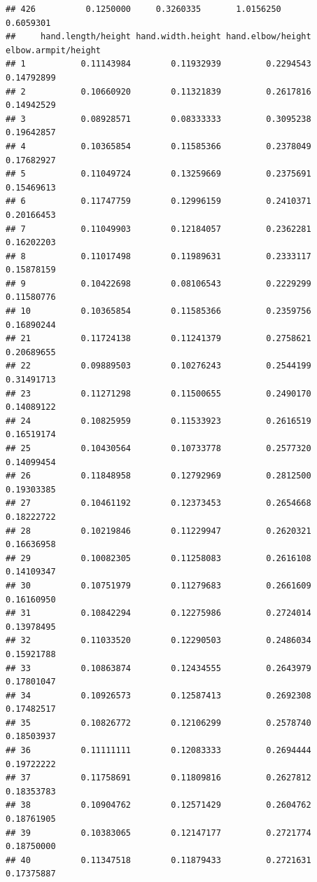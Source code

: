 \documentclass[]{article}
\begin{document}
\begin{verbatim}
## 426          0.1250000     0.3260335       1.0156250          0.6059301
##     hand.length/height hand.width.height hand.elbow/height elbow.armpit/height
## 1           0.11143984        0.11932939         0.2294543          0.14792899
## 2           0.10660920        0.11321839         0.2617816          0.14942529
## 3           0.08928571        0.08333333         0.3095238          0.19642857
## 4           0.10365854        0.11585366         0.2378049          0.17682927
## 5           0.11049724        0.13259669         0.2375691          0.15469613
## 6           0.11747759        0.12996159         0.2410371          0.20166453
## 7           0.11049903        0.12184057         0.2362281          0.16202203
## 8           0.11017498        0.11989631         0.2333117          0.15878159
## 9           0.10422698        0.08106543         0.2229299          0.11580776
## 10          0.10365854        0.11585366         0.2359756          0.16890244
## 21          0.11724138        0.11241379         0.2758621          0.20689655
## 22          0.09889503        0.10276243         0.2544199          0.31491713
## 23          0.11271298        0.11500655         0.2490170          0.14089122
## 24          0.10825959        0.11533923         0.2616519          0.16519174
## 25          0.10430564        0.10733778         0.2577320          0.14099454
## 26          0.11848958        0.12792969         0.2812500          0.19303385
## 27          0.10461192        0.12373453         0.2654668          0.18222722
## 28          0.10219846        0.11229947         0.2620321          0.16636958
## 29          0.10082305        0.11258083         0.2616108          0.14109347
## 30          0.10751979        0.11279683         0.2661609          0.16160950
## 31          0.10842294        0.12275986         0.2724014          0.13978495
## 32          0.11033520        0.12290503         0.2486034          0.15921788
## 33          0.10863874        0.12434555         0.2643979          0.17801047
## 34          0.10926573        0.12587413         0.2692308          0.17482517
## 35          0.10826772        0.12106299         0.2578740          0.18503937
## 36          0.11111111        0.12083333         0.2694444          0.19722222
## 37          0.11758691        0.11809816         0.2627812          0.18353783
## 38          0.10904762        0.12571429         0.2604762          0.18761905
## 39          0.10383065        0.12147177         0.2721774          0.18750000
## 40          0.11347518        0.11879433         0.2721631          0.17375887

\end{verbatim}
\end{document}
